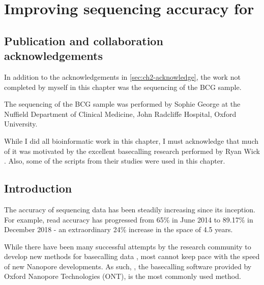 \chapter{Improving \ont{} sequencing accuracy for \mtb{}}
\label{chap:tubby}

\setcounter{section}{-1}
\section{Publication and collaboration acknowledgements}
\label{sec:ch4-acknowledge}

In addition to the acknowledgements in \autoref{sec:ch2-acknowledge}, the work not completed by myself in this chapter was the sequencing of the BCG sample.

The \ont{} sequencing of the BCG sample was performed by Sophie George at the Nuffield Department of Clinical Medicine, John Radcliffe Hospital, Oxford University.

While I did all bioinformatic work in this chapter, I must acknowledge that much of it was motivated by the excellent \ont{} basecalling research performed by Ryan Wick \etal{} \cite{wick2019,wick2020}. Also, some of the scripts from their studies were used in this chapter.

\section{Introduction}
The accuracy of \ont{} sequencing data has been steadily increasing since its inception. For example, read accuracy has progressed from 65\% in June 2014 \cite{Loman2015} to 89.17\% in December 2018 \cite{wick2019} - an extraordinary 24\% increase in the space of 4.5 years. 

While there have been many successful attempts by the research community to develop new methods for basecalling \ont{} data \cite{chiron2018,Stoiber2017,Boza2020}, most cannot keep pace with the speed of new Nanopore developments. As such, \guppy{}, the basecalling software provided by Oxford Nanopore Technologies (ONT), is the most commonly used method.

